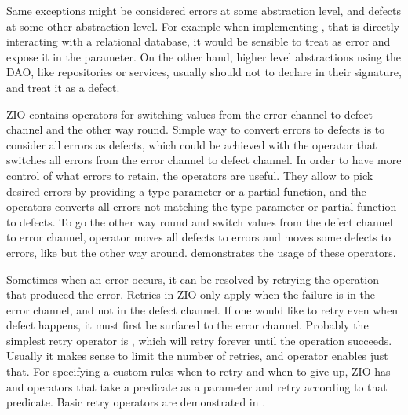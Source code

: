 

Same exceptions might be considered errors at some abstraction level, and defects at some other abstraction level. For example when implementing , that is directly interacting with a relational database, it would be sensible to treat  as error and expose it in the  parameter. On the other hand, higher level abstractions using the DAO, like repositories or services, usually should not to declare  in their signature, and treat it as a defect.

ZIO contains operators for switching values from the error channel to defect channel and the other way round. Simple way to convert errors to defects is to consider all errors as defects, which could be achieved with the  operator that switches all errors from the error channel to defect channel. In order to have more control of what errors to retain, the  operators are useful. They allow to pick desired errors by providing a type parameter or a partial function, and the operators converts all errors not matching the type parameter or partial function to defects. To go the other way round and switch values from the defect channel to error channel,  operator moves all defects to errors and  moves some defects to errors, like  but the other way around.  demonstrates the usage of these operators.



Sometimes when an error occurs, it can be resolved by retrying the operation that produced the error. Retries in ZIO only apply when the failure is in the error channel, and not in the defect channel. If one would like to retry even when defect happens, it must first be surfaced to the error channel. Probably the simplest retry operator is , which will retry forever until the operation succeeds. Usually it makes sense to limit the number of retries, and  operator enables just that. For specifying a custom rules when to retry and when to give up, ZIO has  and  operators that take a predicate as a parameter and retry according to that predicate. Basic retry operators are demonstrated in .



